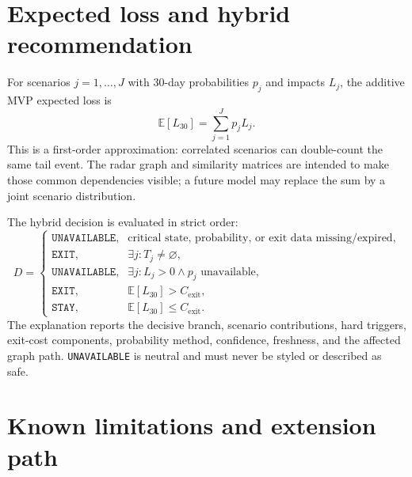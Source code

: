 \documentclass[11pt,a4paper]{article}
\newcommand{\E}{\mathbb{E}}
\begin{document}
\section{Expected loss and hybrid recommendation}

For scenarios $j=1,\ldots,J$ with 30-day probabilities $p_j$ and impacts $L_j$,
the additive MVP expected loss is
\begin{equation}
\E[L_{30}]=\sum_{j=1}^{J}p_jL_j.
\end{equation}
This is a first-order approximation: correlated scenarios can double-count the
same tail event.  The radar graph and similarity matrices are intended to make
those common dependencies visible; a future model may replace the sum by a
joint scenario distribution.

The hybrid decision is evaluated in strict order:
\begin{equation}
D=
\begin{cases}
\texttt{UNAVAILABLE}, & \text{critical state, probability, or exit data missing/expired},\\
\texttt{EXIT}, & \exists j:T_j\neq\varnothing,\\
\texttt{UNAVAILABLE}, & \exists j:L_j>0\land p_j\text{ unavailable},\\
\texttt{EXIT}, & \E[L_{30}]>C_{\mathrm{exit}},\\
\texttt{STAY}, & \E[L_{30}]\leq C_{\mathrm{exit}}.
\end{cases}
\end{equation}
The explanation reports the decisive branch, scenario contributions, hard
triggers, exit-cost components, probability method, confidence, freshness, and
the affected graph path.  \texttt{UNAVAILABLE} is neutral and must never be
styled or described as safe.

\section{Known limitations and extension path}
\end{document}
